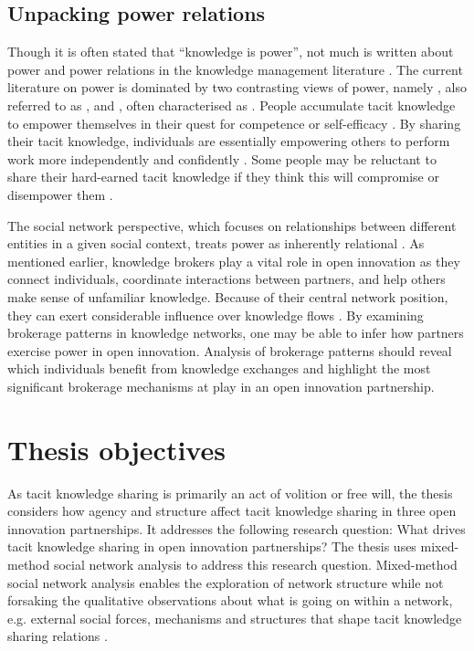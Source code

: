 \subsection{Unpacking power relations} 

Though it is often stated that \enquote{knowledge is power}, not much is written about power and power relations in the knowledge management literature \citep{haugaard2012rethinking}. The current literature on power is dominated by two contrasting views of power, namely , also referred to as , and , often characterised as  \citep{haugaard2012rethinking}.  People accumulate tacit knowledge to empower themselves in their quest for competence or self-efficacy \citep{endres2007tacit}. By sharing their tacit knowledge, individuals are essentially empowering others to perform work more independently and confidently \citep{bordum2002tacit,lin2007share}. Some people may be reluctant to share their hard-earned tacit knowledge if they think this will compromise or disempower them \citep{schultze2004knowing,singh2019territoriality}. \medskip

The social network perspective, which focuses on relationships between different entities in a given social context, treats power as inherently relational \citep{ibarra1993power}. As mentioned earlier, knowledge brokers play a vital role in open innovation as they connect individuals, coordinate interactions between partners, and help others make sense of unfamiliar knowledge. Because of their central network position, they can exert considerable influence over knowledge flows \citep{burt1992structural}. By examining brokerage patterns in knowledge networks, one may be able to infer how partners exercise power in open innovation. Analysis of brokerage patterns should reveal which individuals benefit from knowledge exchanges and highlight the most significant brokerage mechanisms at play in an open innovation partnership. 

\section{Thesis objectives}

As tacit knowledge sharing is primarily an act of volition or free will, the thesis considers how agency and structure affect tacit knowledge sharing in three open innovation partnerships. It addresses the following research question: What drives tacit knowledge sharing in open innovation partnerships? The thesis uses mixed-method social network analysis to address this research question. Mixed-method social network analysis enables the exploration of network structure while not forsaking the qualitative observations about what is going on within a network, e.g. external social forces, mechanisms and structures that shape tacit knowledge sharing relations \citep{crossley2010social}. \medskip

